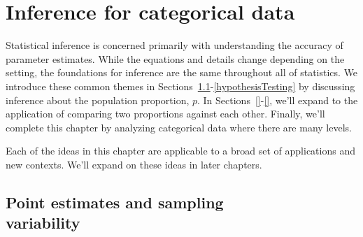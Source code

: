 
\chapter{Inference for categorical data}
\label{inferenceForCategoricalData}

Statistical inference is concerned primarily with understanding the
accuracy of parameter estimates. While the equations and details change
depending on the setting, the foundations for inference are the same
throughout all of statistics. We introduce these common themes in
Sections~\ref{pointEstimates}-\ref{hypothesisTesting} by discussing
inference about the population proportion, $p$.
In Sections~\ref{}-\ref{}, we'll expand
to the application of comparing two proportions against each other.
Finally, we'll complete this chapter by analyzing categorical data
where there are many levels.

Each of the ideas in this chapter are applicable to a broad set of
applications and new contexts. We'll expand on these ideas in later
chapters.





\section[Point estimates and sampling variability]
    {Point estimates and sampling \\ variability}
\label{pointEstimates}


\newcommand{\pewsolarpollsize}{1000}
\newcommand{\pewsolarpollprop}{0.887}
\newcommand{\pewsolarpollpropcomplement}{0.113}
\newcommand{\pewsolarpollpercent}{88.7}
\newcommand{\pewsolarpollpercentcomplement}{11.3}
\newcommand{\pewsolarpollcount}{887}
\newcommand{\pewsolarpollcountcomplement}{113}
\newcommand{\pewsolarpollse}{0.0100}


